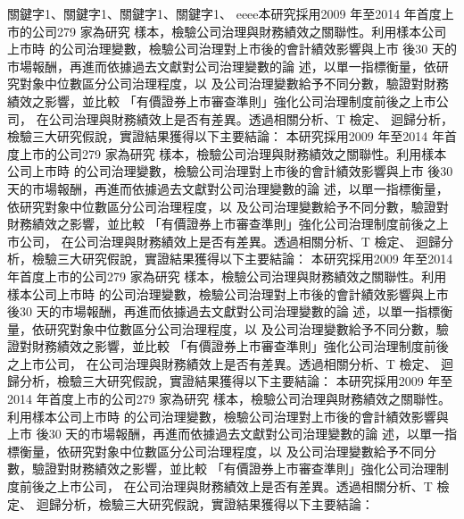 \documentclass[
    添加扉页=是,
    添加原創聲明頁=是,
    添加校徽水印=是,
    奇偶页邊距對稱=不,
]{.def/must}
\def\测试{eeee}
\begin{document}
\begin{abstract@cn}{關鍵字1、關鍵字1、關鍵字1、關鍵字1、}
\测试 本研究採用2009 年至2014 年首度上市的公司279 家為研究
樣本，檢驗公司治理與財務績效之關聯性。利用樣本公司上市時
的公司治理變數，檢驗公司治理對上市後的會計績效影響與上市
後30 天的市場報酬，再進而依據過去文獻對公司治理變數的論
述，以單一指標衡量，依研究對象中位數區分公司治理程度，以
及公司治理變數給予不同分數，驗證對財務績效之影響，並比較
「有價證券上市審查準則」強化公司治理制度前後之上市公司，
在公司治理與財務績效上是否有差異。透過相關分析、T 檢定、
迴歸分析，檢驗三大研究假說，實證結果獲得以下主要結論：
本研究採用2009 年至2014 年首度上市的公司279 家為研究
樣本，檢驗公司治理與財務績效之關聯性。利用樣本公司上市時
的公司治理變數，檢驗公司治理對上市後的會計績效影響與上市
後30 天的市場報酬，再進而依據過去文獻對公司治理變數的論
述，以單一指標衡量，依研究對象中位數區分公司治理程度，以
及公司治理變數給予不同分數，驗證對財務績效之影響，並比較
「有價證券上市審查準則」強化公司治理制度前後之上市公司，
在公司治理與財務績效上是否有差異。透過相關分析、T 檢定、
迴歸分析，檢驗三大研究假說，實證結果獲得以下主要結論：
本研究採用2009 年至2014 年首度上市的公司279 家為研究
樣本，檢驗公司治理與財務績效之關聯性。利用樣本公司上市時
的公司治理變數，檢驗公司治理對上市後的會計績效影響與上市
後30 天的市場報酬，再進而依據過去文獻對公司治理變數的論
述，以單一指標衡量，依研究對象中位數區分公司治理程度，以
及公司治理變數給予不同分數，驗證對財務績效之影響，並比較
「有價證券上市審查準則」強化公司治理制度前後之上市公司，
在公司治理與財務績效上是否有差異。透過相關分析、T 檢定、
迴歸分析，檢驗三大研究假說，實證結果獲得以下主要結論：
本研究採用2009 年至2014 年首度上市的公司279 家為研究
樣本，檢驗公司治理與財務績效之關聯性。利用樣本公司上市時
的公司治理變數，檢驗公司治理對上市後的會計績效影響與上市
後30 天的市場報酬，再進而依據過去文獻對公司治理變數的論
述，以單一指標衡量，依研究對象中位數區分公司治理程度，以
及公司治理變數給予不同分數，驗證對財務績效之影響，並比較
「有價證券上市審查準則」強化公司治理制度前後之上市公司，
在公司治理與財務績效上是否有差異。透過相關分析、T 檢定、
迴歸分析，檢驗三大研究假說，實證結果獲得以下主要結論：
\end{abstract@cn}
\end{document}
